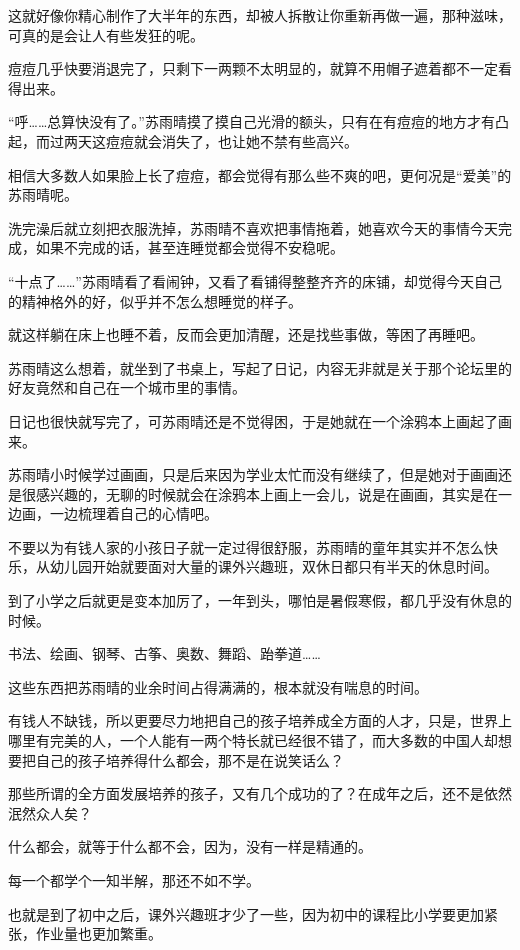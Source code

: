 这就好像你精心制作了大半年的东西，却被人拆散让你重新再做一遍，那种滋味，可真的是会让人有些发狂的呢。

痘痘几乎快要消退完了，只剩下一两颗不太明显的，就算不用帽子遮着都不一定看得出来。

“呼……总算快没有了。”苏雨晴摸了摸自己光滑的额头，只有在有痘痘的地方才有凸起，而过两天这痘痘就会消失了，也让她不禁有些高兴。

相信大多数人如果脸上长了痘痘，都会觉得有那么些不爽的吧，更何况是“爱美”的苏雨晴呢。

洗完澡后就立刻把衣服洗掉，苏雨晴不喜欢把事情拖着，她喜欢今天的事情今天完成，如果不完成的话，甚至连睡觉都会觉得不安稳呢。

“十点了……”苏雨晴看了看闹钟，又看了看铺得整整齐齐的床铺，却觉得今天自己的精神格外的好，似乎并不怎么想睡觉的样子。

就这样躺在床上也睡不着，反而会更加清醒，还是找些事做，等困了再睡吧。

苏雨晴这么想着，就坐到了书桌上，写起了日记，内容无非就是关于那个论坛里的好友竟然和自己在一个城市里的事情。

日记也很快就写完了，可苏雨晴还是不觉得困，于是她就在一个涂鸦本上画起了画来。

苏雨晴小时候学过画画，只是后来因为学业太忙而没有继续了，但是她对于画画还是很感兴趣的，无聊的时候就会在涂鸦本上画上一会儿，说是在画画，其实是在一边画，一边梳理着自己的心情吧。

不要以为有钱人家的小孩日子就一定过得很舒服，苏雨晴的童年其实并不怎么快乐，从幼儿园开始就要面对大量的课外兴趣班，双休日都只有半天的休息时间。

到了小学之后就更是变本加厉了，一年到头，哪怕是暑假寒假，都几乎没有休息的时候。

书法、绘画、钢琴、古筝、奥数、舞蹈、跆拳道……

这些东西把苏雨晴的业余时间占得满满的，根本就没有喘息的时间。

有钱人不缺钱，所以更要尽力地把自己的孩子培养成全方面的人才，只是，世界上哪里有完美的人，一个人能有一两个特长就已经很不错了，而大多数的中国人却想要把自己的孩子培养得什么都会，那不是在说笑话么？

那些所谓的全方面发展培养的孩子，又有几个成功的了？在成年之后，还不是依然泯然众人矣？

什么都会，就等于什么都不会，因为，没有一样是精通的。

每一个都学个一知半解，那还不如不学。

也就是到了初中之后，课外兴趣班才少了一些，因为初中的课程比小学要更加紧张，作业量也更加繁重。

